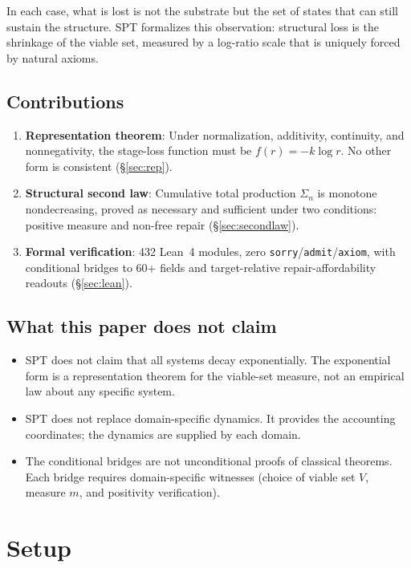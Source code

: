 \documentclass[11pt,a4paper]{article}
\begin{document}
In each case, what is lost is not the substrate but the set of states that can still sustain the structure. SPT formalizes this observation: structural loss is the shrinkage of the viable set, measured by a log-ratio scale that is uniquely forced by natural axioms.

\subsection{Contributions}

\begin{enumerate}
\item \textbf{Representation theorem}: Under normalization, additivity, continuity, and nonnegativity, the stage-loss function must be $f(r)=-k\log r$. No other form is consistent (\S\ref{sec:rep}).
\item \textbf{Structural second law}: Cumulative total production $\Sigma_n$ is monotone nondecreasing, proved as necessary and sufficient under two conditions: positive measure and non-free repair (\S\ref{sec:secondlaw}).
\item \textbf{Formal verification}: 432 Lean~4 modules, zero \texttt{sorry}/\texttt{admit}/\texttt{axiom}, with conditional bridges to 60+ fields and target-relative repair-affordability readouts (\S\ref{sec:lean}).
\end{enumerate}

\subsection{What this paper does not claim}

\begin{itemize}
\item SPT does not claim that all systems decay exponentially. The exponential form is a representation theorem for the viable-set measure, not an empirical law about any specific system.
\item SPT does not replace domain-specific dynamics. It provides the accounting coordinates; the dynamics are supplied by each domain.
\item The conditional bridges are not unconditional proofs of classical theorems. Each bridge requires domain-specific witnesses (choice of viable set $V$, measure $m$, and positivity verification).
\end{itemize}

\section{Setup}
\end{document}
